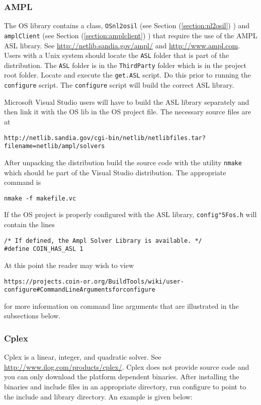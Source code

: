 \documentclass[11pt]{article}
\renewcommand{\_}{{\char"5F}}
\renewcommand{\{}{{\char"7B}}
\renewcommand{\}}{{\char"7D}}
\renewcommand{\^}{{\char"0D}}
\renewcommand{\'}{{\char"0D}}
\begin{document}
\subsubsection{AMPL}

The OS library contains a class, {\tt OSnl2osil} (see Section (\ref{section:nl2osil}) ) and {\tt amplClient} (see Section (\ref{section:amplclient}) ) that require the use of the AMPL ASL library.  See \url{http://netlib.sandia.gov/ampl/}  and  \url{http://www.ampl.com}. Users with a Unix system should locate the {\tt ASL} folder that is part of the distribution. The {\tt ASL} folder is in the {\tt ThirdParty} folder which is in the project root folder. Locate and execute the {\tt get.ASL} script.  Do this prior to running the {\tt configure} script. The {\tt configure} script will build the correct ASL library.

Microsoft  Visual Studio users will have to build the ASL library separately and then link it with the OS lib in the OS project file.  The necessary source files are at
\begin{verbatim}
http://netlib.sandia.gov/cgi-bin/netlib/netlibfiles.tar?filename=netlib/ampl/solvers
\end{verbatim}
 After unpacking the distribution build the source code with the utility {\tt nmake} which should be part of the Visual Studio distribution. The appropriate command is
\begin{verbatim}
nmake -f makefile.vc
\end{verbatim}
If the OS project is properly configured  with the ASL library, {\tt config\_os.h} will contain the lines
\begin{verbatim}
/* If defined, the Ampl Solver Library is available. */
#define COIN_HAS_ASL 1
\end{verbatim}

At this point the reader may wish to view
\begin{verbatim}
https://projects.coin-or.org/BuildTools/wiki/user-configure#CommandLineArgumentsforconfigure
\end{verbatim}
for more information on command line arguments that are illustrated in the subsections below.


\subsubsection{Cplex}

Cplex is a linear, integer, and quadratic solver. See \url{http://www.ilog.com/products/cplex/}.  Cplex does not provide source code and you can only download the platform dependent binaries. After installing the binaries and include files in an appropriate directory, run configure to point to the include and library directory. An example is given below:
\end{document}

